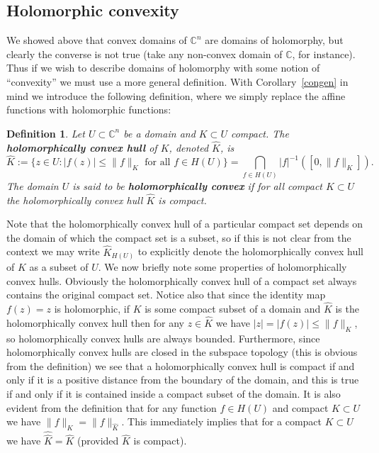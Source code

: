 \documentclass[11pt,a4paper, final, twoside]{article}
\newtheorem{definition}[theorem]{Definition}
\numberwithin{equation}{section}
\newcommand{\C}{\mathbb C}
\newcommand{\hol}{H}
\begin{document}
\subsection{Holomorphic convexity}
We showed above that convex domains of $\C^n$ are domains of holomorphy, but clearly the converse is not true (take any non-convex domain of $\C$, for instance). Thus if we wish 
to describe domains of holomorphy with some notion of ``convexity'' we must use a more general definition. 
With Corollary~\ref{congen} in mind we introduce the following definition, where we simply replace the affine functions with holomorphic functions:
\begin{definition}
Let $U\subset\C^n$ be a domain and $K\subset U$ compact. The \textbf{holomorphically convex hull} of $K$, denoted $\hat K$, is
$$ \hat K:=\{z\in U\colon |f(z)|\leq \|f\|_K \mbox{ for all } f\in H(U)\}=\bigcap_{f\in H(U)} |f|^{-1}([0,\|f\|_K]). $$
The domain $U$ is said to be \textbf{holomorphically convex} if for all compact $K\subset U$ the holomorphically convex hull $\hat K$ is compact. 
\end{definition}
Note that the holomorphically convex hull of a particular compact set depends on the domain of which the compact set is a subset, so if this is not clear from the context
we may write $\hat K_{\hol(U)}$ to explicitly denote the holomorphically convex hull of $K$ as a subset of $U$. 
We now briefly note some properties of holomorphically convex hulls. Obviously the holomorphically convex hull of a compact set always contains the original compact set.
Notice also that since the identity map $f(z)=z$ is holomorphic, if $K$ is some compact subset of a domain and $\hat K$ is the holomorphically convex
hull then for any $z\in\hat K$ we have $|z|=|f(z)|\leq \|f\|_K$, so holomorphically convex hulls are always bounded. Furthermore, since holomorphically convex
hulls are closed in the subspace topology (this is obvious from the definition) we see that 
a holomorphically convex hull is compact if and only if it is a positive distance from the boundary of the domain, and this is true if and only if it is contained inside a compact subset of the domain. 
It is also evident from the definition 
that for any function $f\in\hol(U)$ and compact $K\subset U$
we have $\|f\|_K=\|f\|_{\hat K}$.
This immediately implies that for a compact $K\subset U$ we have $\hat{\hat K}=\hat K$ (provided $\hat K$ is compact).
\end{document}
